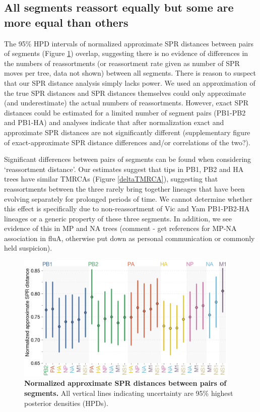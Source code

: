 \documentclass[11pt,oneside,letterpaper]{article}
\begin{document}
\subsection*{All segments reassort equally but some are more equal than others}
The 95\% HPD intervals of normalized approximate SPR distances between pairs of segments (Figure \ref{SPRdistances}) overlap, suggesting there is no evidence of differences in the numbers of reassortments (or reassortment rate given as number of SPR moves per tree, data not shown) between all segments.
There is reason to suspect that our SPR distance analysis simply lacks power.
We used an approximation of the true SPR distances and SPR distances themselves could only approximate (and underestimate) the actual numbers of reassortments.
However, exact SPR distances could be estimated for a limited number of segment pairs (PB1-PB2 and PB1-HA) and analyses indicate that after normalization exact and approximate SPR distances are not significantly different (supplementary figure of exact-approximate SPR distance differences and/or correlations of the two?). 

Significant differences between pairs of segments can be found when considering `reassortment distance'.
Our estimates suggest that tips in PB1, PB2 and HA trees have similar TMRCAs (Figure \ref{deltaTMRCA}), suggesting that reassortments between the three rarely bring together lineages that have been evolving separately for prolonged periods of time.
We cannot determine whether this effect is specifically due to non-reassortment of Vic and Yam PB1-PB2-HA lineages or a generic property of these three segments.
In addition, we see evidence of this in MP and NA trees (comment - get references for MP-NA association in fluA, otherwise put down as personal communication or commonly held suspicion).

\begin{figure}
	\centering		
	\includegraphics[width=0.95\textwidth]{figures/InfB_normalizedApproxSPR.png}
	\caption{\textbf{Normalized approximate SPR distances between pairs of segments.}
All vertical lines indicating uncertainty are 95\% highest posterior densities (HPDs).}
	\label{SPRdistances}
\end{figure}
\end{document}
